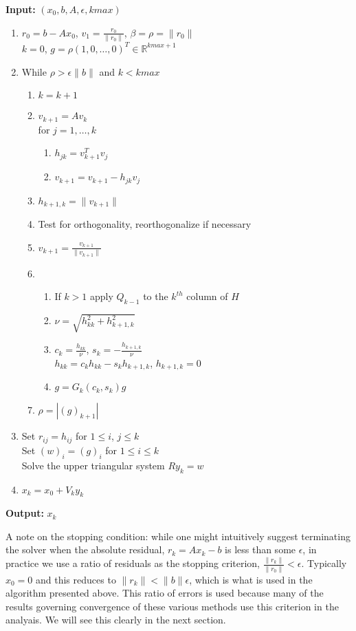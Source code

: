 \documentclass[11pt]{article}
\begin{document}
\textbf{Input:} $(x_0, b, A, \epsilon, kmax)$
\begin{enumerate}
\item $r_0 = b - A x_0$, $v_1 = \frac{r_0}{\| r_0 \|}$, $\beta = \rho = \| r_0 \|$ \\
  $k = 0$, $g = \rho (1, 0, \dots, 0)^T \in \mathbb{R}^{kmax + 1}$
\item While $\rho > \epsilon \| b \|$ and $k < kmax$
  \begin{enumerate}
  \item $k = k + 1$
  \item $v_{k+1} = A v_k$ \\
    for $j = 1, \dots, k$ \\
    \begin{enumerate}
    \item $h_{jk} = v_{k+1}^T v_j$
    \item $v_{k+1} = v_{k+1} - h_{jk} v_j$
    \end{enumerate}
  \item $h_{k+1,k} = \| v_{k+1} \|$
  \item Test for orthogonality, reorthogonalize if necessary
  \item $v_{k+1} = \frac{v_{k+1}}{\| v_{k+1} \|}$
  \item \begin{enumerate}
  \item If $k > 1$ apply $Q_{k-1}$ to the $k^{th}$ column of $H$
  \item $\nu = \sqrt{h_{kk}^2 + h_{k+1,k}^2}$
  \item $c_k = \frac{h_{kk}}{\nu}$, $s_k = -\frac{h_{k+1,k}}{\nu}$ \\
    $h_{kk} = c_k h_{kk} - s_k h_{k+1,k}$, $h_{k+1, k} = 0$
  \item $g = G_k(c_k, s_k)g$
  \end{enumerate}
  \item $\rho = |(g)_{k+1}|$
  \end{enumerate}
  \item Set $r_{ij} = h_{ij}$ for $1 \leq i$, $j \leq k$ \\
    Set $(w)_i = (g)_i$ for $1 \leq i \leq k$ \\
    Solve the upper triangular system $Ry_k = w$
  \item $x_k = x_0 + V_k y_k$
\end{enumerate}

\textbf{Output:} $x_k$

A note on the stopping condition: while one might intuitively suggest terminating the solver when the absolute residual, $r_k = Ax_k - b$ is less than some $\epsilon$, in practice we use a ratio of residuals as the stopping criterion, $\frac{\| r_k \|}{\| r_0 \|} < \epsilon$. Typically $x_0 = 0$ and this reduces to $\| r_k \| < \| b \| \epsilon$, which is what is used in the algorithm presented above. This ratio of errors is used because many of the results governing convergence of these various methods use this criterion in the analyais. We will see this clearly in the next section.
\end{document}
